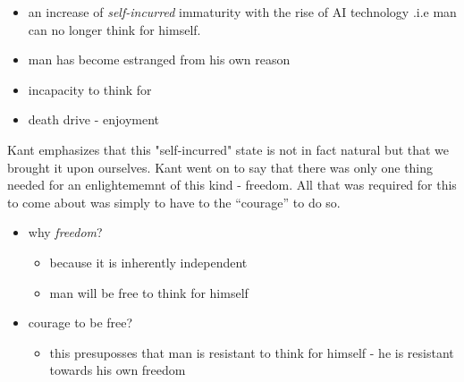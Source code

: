 \documentclass{article}
\begin{document}
\begin{itemize}
\item an increase of \textit{self-incurred} immaturity with the rise of AI technology .i.e man can no longer think for himself. 
\item man has become estranged from his own reason
\item incapacity to think for 
\item death drive - enjoyment
\end{itemize}

Kant emphasizes that this "self-incurred" state is not in fact natural but that we brought it upon ourselves. Kant went on to say that there was only one thing needed for an enlightememnt of this kind - freedom.
All that was required for this to come about was simply to have to the ``courage'' to do so.
\begin{itemize}
\item why  \textit{freedom}?
\begin{itemize}
  \item because it is inherently independent
  \item man will be free to think for himself
\end{itemize}
\item courage to be free?
\begin{itemize}
  \item this presuposses that man is resistant to think for himself - he is resistant towards his own freedom
\end{itemize}
\end{itemize}
\end{document}
